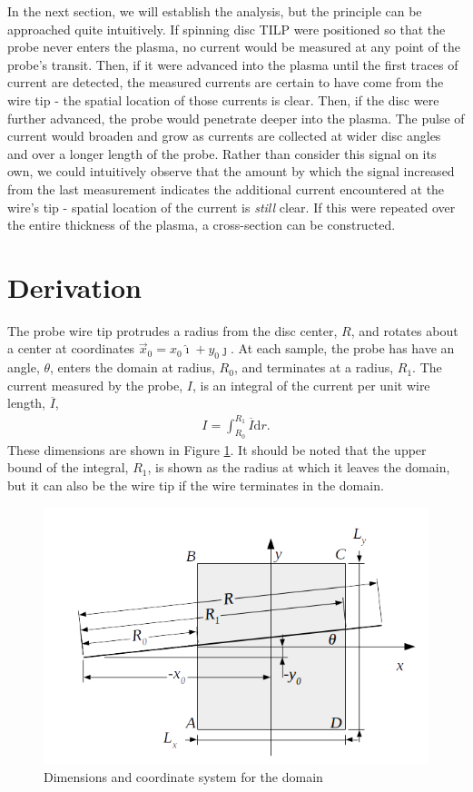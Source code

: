 \documentclass{article}
\def\I{\overline{I}}
\def\d{\mathrm{d}}
\def\ui{\hat{\imath}}
\def\uj{\hat{\jmath}}
\begin{document}
In the next section, we will establish the analysis, but the principle can be approached quite intuitively.  If spinning disc TILP were positioned so that the probe never enters the plasma, no current would be measured at any point of the probe's transit.  Then, if it were advanced into the plasma until the first traces of current are detected, the measured currents are certain to have come from the wire tip - the spatial location of those currents is clear.  Then, if the disc were further advanced, the probe would penetrate deeper into the plasma.  The pulse of current would broaden and grow as currents are collected at wider disc angles and over a longer length of the probe.  Rather than consider this signal on its own, we could intuitively observe that the amount by which the signal increased from the last measurement indicates the additional current encountered at the wire's tip - spatial location of the current is \emph{still} clear.  If this were repeated over the entire thickness of the plasma, a cross-section can be constructed.

\section{Derivation}

The probe wire tip protrudes a radius from the disc center, $R$, and rotates about a center at coordinates $\vec{x}_0 = x_0\ui + y_0\uj$.  At each sample, the probe has have an angle, $\theta$, enters the domain at radius, $R_0$, and terminates at a radius, $R_1$.  The current measured by the probe, $I$, is an integral of the current per unit wire length, $\I$,
\begin{align}
I = \int_{R_0}^{R_1} \I \d r.
\end{align}
These dimensions are shown in Figure \ref{fig:coords}.  It should be noted that the upper bound of the integral, $R_1$, is shown as the radius at which it leaves the domain, but it can also be the wire tip if the wire terminates in the domain.
\begin{figure}
\centering
\includegraphics[width=.9\linewidth]{figures/coords}
\caption{Dimensions and coordinate system for the domain}\label{fig:coords}
\end{figure}
\end{document}
